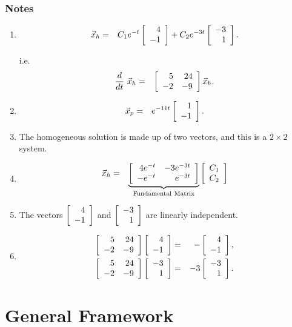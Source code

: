\begin{frame}[allowframebreaks]
  \frametitle{Notes}

  \begin{enumerate}
  \item
    \begin{eqnarray*}
      \vec{x}_h & = & C_1 e^{-t} \vecTwo{4}{-1} 
      + C_2 e^{-3t} \vecTwo{-3}{1}.
    \end{eqnarray*}


    i.e.
    \begin{eqnarray*}
      \deriv{~}{t} \vec{x}_h & = & \arrayTwo{5}{24}{-2}{-9} \vec{x}_h.
    \end{eqnarray*}

  \item
    \begin{eqnarray*}
      \vec{x}_p & = & e^{-11t} \vecTwo{1}{-1}.
    \end{eqnarray*}

  \item The homogeneous solution is made up of two vectors, and this
    is a $2\times 2$ system.

  \item 
    \begin{eqnarray*}
      \vec{x}_h & = &
      \underbrace{\arrayTwo{4e^{-t}}{-3e^{-3t}}{-e^{-t}}{e^{-3t}}}_{\mathrm{Fundamental~Matrix}}
      \vecTwo{C_1}{C_2} 
    \end{eqnarray*}

  \item The vectors $\vecTwo{4}{-1}$ and $\vecTwo{-3}{1}$ are linearly
    independent.

  \item
    \begin{eqnarray*}
      \arrayTwo{5}{24}{-2}{-9} \vecTwo{4}{-1} & = & - \vecTwo{4}{-1}, \\
      \arrayTwo{5}{24}{-2}{-9} \vecTwo{-3}{1} & = & -3 \vecTwo{-3}{1}.
    \end{eqnarray*}



  \end{enumerate}

\end{frame}

\section{General Framework}

